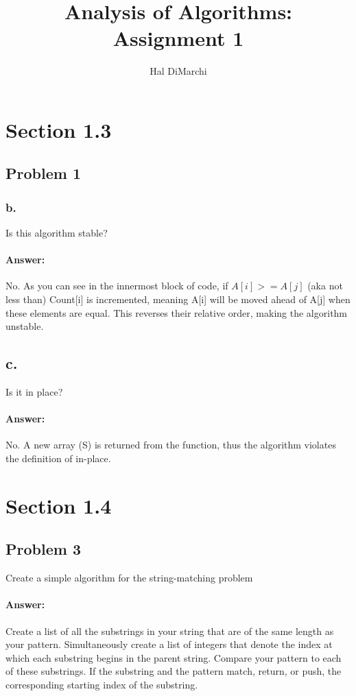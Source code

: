 \documentclass{article}
\title{Analysis of Algorithms: Assignment 1}
\author{Hal DiMarchi}
\begin{document}
\maketitle
\tableofcontents
\newpage
{}
\section{Section 1.3}
  \subsection{Problem 1}
    \subsubsection{b.}
      Is this algorithm stable?
      \paragraph{Answer:}
        No. As you can see in the innermost block of code, if $A[i] >= A[j]$ (aka not less than)
        Count[i] is incremented, meaning A[i] will be moved ahead of A[j] when these elements are equal.
        This reverses their relative order, making the algorithm unstable.
    \subsection{c. }
      Is it in place?
      \paragraph{Answer:}
        No. A new array (S) is returned from the function, thus the algorithm violates the definition of in-place.
\section{Section 1.4}
  \subsection{Problem 3}
        Create a simple algorithm for the string-matching problem
      \paragraph{Answer:}
        Create a list of all the substrings in your string that are of the same length as your pattern.
        Simultaneously create a list of integers that denote the index at which each substring begins in the parent
        string.
        Compare your pattern to each of these substrings. If the substring and the pattern match, return, or push, the corresponding
        starting index of the substring.
\end{document}
